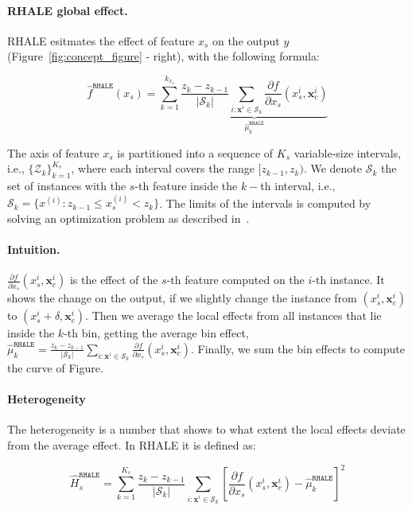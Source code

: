 \documentclass[
twocolumn,
]{ceurart}
\newcommand{\xb}{\mathbf{x}}
\newcommand{\xci}{\mathbf{x}^i_c}
\begin{document}
\paragraph{RHALE global effect.}

RHALE esitmates the effect of feature $x_s$ on the output $y$ (Figure~\ref{fig:concept_figure} - right), with the following formula:

\begin{equation}
  \label{eq:rhale-approximation}
\hat{f}^{\mathtt{RHALE}}(x_s) = \sum_{k=1}^{k_{x_s}} \underbrace{\frac{z_k - z_{k-1}}{ \left | \mathcal{S}_k \right |} \sum_{i: \xb^i \in \mathcal{S}_k} \frac{\partial f}{\partial x_s} (x_s^i, \xci)}_{\hat{\mu}_k^{\mathtt{RHALE}}}
\end{equation}

\noindent
The axis of feature $x_s$ is partitioned into a sequence of $K_s$ variable-size intervals, i.e., $\{\mathcal{Z}_k\}_{k=1}^{K_s}$, where each interval covers the range $[z_{k-1}, z_k)$. We denote $\mathcal{S}_k$ the set of instances with the $s$-th feature inside the $k-$th interval, i.e., $\mathcal{S}_k = \{ x^{(i)} : z_{k-1} \leq x^{(i)}_s < z_k \}$. The limits of the intervals is computed by solving an optimization problem as described in~\citep{gkolemis2023rhale}.

\paragraph{Intuition.} $\frac{\partial f}{\partial x_s} (x_s^i, \xci)$ is the effect of the $s$-th feature computed on the $i$-th instance. It shows the change on the output, if we slightly change the instance from $(x_s^i, \xci)$ to $(x_s^i + \delta, \xci)$. Then we average the local effects from all instances that lie inside the $k$-th bin, getting the average bin effect, $\hat{\mu}_k^{\mathtt{RHALE}} = \frac{z_k - z_{k-1}}{ \left | \mathcal{S}_k \right |} \sum_{i: \xb^i \in \mathcal{S}_k} \frac{\partial f}{\partial x_s} (x_s^i, \xci)$. Finally, we sum the bin effects to compute the curve of Figure.

\paragraph{Heterogeneity}

The heterogeneity is a number that shows to what extent the local effects deviate from the average effect. In RHALE it is defined as:

\begin{equation}
  \label{eq:rhale-approximation-heterogeneity}
  \hat{H}_s^{\mathtt{RHALE}} = \sum_{k=1}^{K_s} \frac{z_k - z_{k-1}}{|\mathcal{S}_k|}\sum_{i: \xb^i \in \mathcal{S}_k} \left [ \frac{\partial f}{\partial x_s} (x_s^i, \xci) - \hat{\mu}_k^{\mathtt{RHALE}} \right ]^2
\end{equation}
\end{document}
